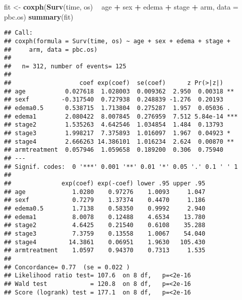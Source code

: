 \documentclass[
  ignorenonframetext,
]{beamer}
\newenvironment{Shaded}{\begin{snugshade}}{\end{snugshade}}
\newcommand{\DataTypeTok}[1]{\textcolor[rgb]{0.13,0.29,0.53}{#1}}
\newcommand{\KeywordTok}[1]{\textcolor[rgb]{0.13,0.29,0.53}{\textbf{#1}}}
\newcommand{\NormalTok}[1]{#1}
\newcommand{\OperatorTok}[1]{\textcolor[rgb]{0.81,0.36,0.00}{\textbf{#1}}}
\newcommand{\StringTok}[1]{\textcolor[rgb]{0.31,0.60,0.02}{#1}}
\begin{document}
\begin{frame}[fragile]{}
\protect\hypertarget{section-1}{}

\tiny

\begin{Shaded}
\begin{Highlighting}[]
\NormalTok{fit <-}\StringTok{ }\KeywordTok{coxph}\NormalTok{(}\KeywordTok{Surv}\NormalTok{(time, os) }\OperatorTok{~}\StringTok{ }\NormalTok{age }\OperatorTok{+}\StringTok{ }\NormalTok{sex }\OperatorTok{+}\StringTok{ }\NormalTok{edema}
             \OperatorTok{+}\StringTok{ }\NormalTok{stage }\OperatorTok{+}\StringTok{ }\NormalTok{arm, }\DataTypeTok{data =}\NormalTok{ pbc.os)}
\KeywordTok{summary}\NormalTok{(fit)}
\end{Highlighting}
\end{Shaded}

\begin{verbatim}
## Call:
## coxph(formula = Surv(time, os) ~ age + sex + edema + stage + 
##     arm, data = pbc.os)
## 
##   n= 312, number of events= 125 
## 
##                   coef exp(coef)  se(coef)      z Pr(>|z|)    
## age           0.027618  1.028003  0.009362  2.950  0.00318 ** 
## sexf         -0.317540  0.727938  0.248839 -1.276  0.20193    
## edema0.5      0.538715  1.713804  0.275287  1.957  0.05036 .  
## edema1        2.080422  8.007845  0.276959  7.512 5.84e-14 ***
## stage2        1.535263  4.642546  1.034854  1.484  0.13793    
## stage3        1.998217  7.375893  1.016097  1.967  0.04923 *  
## stage4        2.666263 14.386101  1.016234  2.624  0.00870 ** 
## armtreatment  0.057946  1.059658  0.189200  0.306  0.75940    
## ---
## Signif. codes:  0 '***' 0.001 '**' 0.01 '*' 0.05 '.' 0.1 ' ' 1
## 
##              exp(coef) exp(-coef) lower .95 upper .95
## age             1.0280    0.97276    1.0093     1.047
## sexf            0.7279    1.37374    0.4470     1.186
## edema0.5        1.7138    0.58350    0.9992     2.940
## edema1          8.0078    0.12488    4.6534    13.780
## stage2          4.6425    0.21540    0.6108    35.288
## stage3          7.3759    0.13558    1.0067    54.040
## stage4         14.3861    0.06951    1.9630   105.430
## armtreatment    1.0597    0.94370    0.7313     1.535
## 
## Concordance= 0.77  (se = 0.022 )
## Likelihood ratio test= 107.6  on 8 df,   p=<2e-16
## Wald test            = 120.8  on 8 df,   p=<2e-16
## Score (logrank) test = 177.1  on 8 df,   p=<2e-16
\end{verbatim}

\end{frame}
\end{document}
